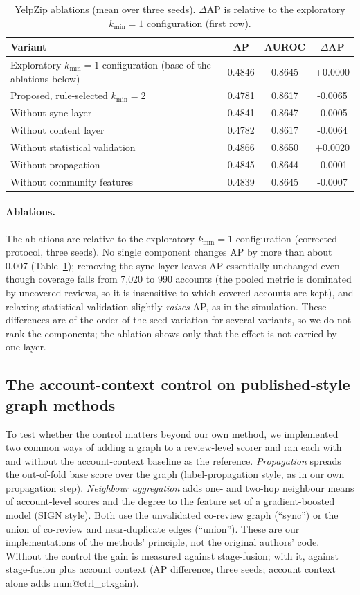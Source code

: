 \documentclass[pdflatex,sn-basic]{sn-jnl}
\makeatletter
\theoremstyle{thmstyleone}
\theoremstyle{thmstylethree}
\newcommand{\num}[1]{\csname num@#1\endcsname}
\makeatother
\begin{document}
\begin{table}[t]
\caption{YelpZip ablations (mean over three seeds). $\Delta$AP is relative to the exploratory $k_{\min}=1$ configuration (first row).}\label{tab:yelp_abl}
\small\setlength{\tabcolsep}{2pt}
\begin{tabular}{@{}lccc@{}}
\toprule
Variant & AP & AUROC & $\Delta$AP \\
\midrule
Exploratory $k_{\min}=1$ configuration (base of the ablations below) & 0.4846 & 0.8645 & +0.0000 \\
Proposed, rule-selected $k_{\min}=2$ & 0.4781 & 0.8617 & -0.0065 \\
Without sync layer & 0.4841 & 0.8647 & -0.0005 \\
Without content layer & 0.4782 & 0.8617 & -0.0064 \\
Without statistical validation & 0.4866 & 0.8650 & +0.0020 \\
Without propagation & 0.4845 & 0.8644 & -0.0001 \\
Without community features & 0.4839 & 0.8645 & -0.0007 \\
\bottomrule
\end{tabular}
\end{table}

\paragraph{Ablations.} The ablations are relative to the exploratory $k_{\min}=1$ configuration (corrected protocol, three seeds). No single component changes AP by more than about 0.007 (Table~\ref{tab:yelp_abl}); removing the sync layer leaves AP essentially unchanged even though coverage falls from 7{,}020 to 990 accounts (the pooled metric is dominated by uncovered reviews, so it is insensitive to which covered accounts are kept), and relaxing statistical validation slightly \emph{raises} AP, as in the simulation. These differences are of the order of the seed variation for several variants, so we do not rank the components; the ablation shows only that the effect is not carried by one layer.

\subsection{The account-context control on published-style graph methods}\label{sec:res_ctrl}
To test whether the control matters beyond our own method, we implemented two common ways of adding a graph to a review-level scorer and ran each with and without the account-context baseline as the reference. \emph{Propagation} spreads the out-of-fold base score over the graph (label-propagation style, as in our own propagation step). \emph{Neighbour aggregation} adds one- and two-hop neighbour means of account-level scores and the degree to the feature set of a gradient-boosted model (SIGN style). Both use the unvalidated co-review graph (``sync'') or the union of co-review and near-duplicate edges (``union''). These are our implementations of the methods' principle, not the original authors' code. Without the control the gain is measured against stage-fusion; with it, against stage-fusion plus account context (AP difference, three seeds; account context alone adds \num{ctrl_ctxgain}).
\end{document}
